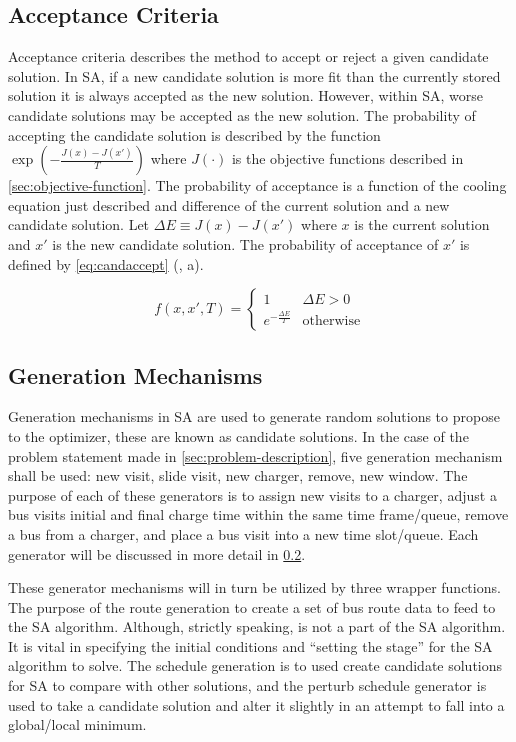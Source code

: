 \documentclass[11pt,a4paper,final]{article}
\newcommand{\Tau}{T}                        %
\begin{document}
\subsection{Acceptance Criteria}
\label{sec:acceptance}
Acceptance criteria describes the method to accept or reject a given candidate solution. In SA, if a new candidate
solution is more fit than the currently stored solution it is always accepted as the new solution. However, within SA,
worse candidate solutions may be accepted as the new solution. The probability of accepting the candidate solution is
described by the function \(\exp(-\frac{J(x) - J(x')}{\Tau})\) where \(J(\cdot)\) is the objective functions described in
\ref{sec:objective-function}. The probability of acceptance is a function of the cooling equation just described and
difference of the current solution and a new candidate solution. Let \(\Delta E \equiv J(x) - J(x')\) where \(x\) is the current
solution and \(x'\) is the new candidate solution. The probability of acceptance of \(x'\) is defined by \ref{eq:candaccept}
(, a).

\begin{equation}
\label{eq:candaccept}
f(x,x',T) =
\begin{cases}
  1                 & \Delta E > 0 \\
  e^{- \frac{\Delta E}{T}} & \text{otherwise}
\end{cases}
\end{equation}

\subsection{Generation Mechanisms}
\label{sec:generators}
Generation mechanisms in SA are used to generate random solutions to propose to the optimizer, these are known as
candidate solutions. In the case of the problem statement made in \ref{sec:problem-description}, five generation mechanism
shall be used: new visit, slide visit, new charger, remove, new window. The purpose of each of these generators is to
assign new visits to a charger, adjust a bus visits initial and final charge time within the same time frame/queue,
remove a bus from a charger, and place a bus visit into a new time slot/queue. Each generator will be discussed in more
detail in \ref{sec:generators}.

These generator mechanisms will in turn be utilized by three wrapper functions. The purpose of the route generation to
create a set of bus route data to feed to the SA algorithm. Although, strictly speaking, is not a part of the SA
algorithm. It is vital in specifying the initial conditions and ``setting the stage'' for the SA algorithm to solve. The
schedule generation is to used create candidate solutions for SA to compare with other solutions, and the perturb
schedule generator is used to take a candidate solution and alter it slightly in an attempt to fall into a global/local
minimum.
\end{document}

